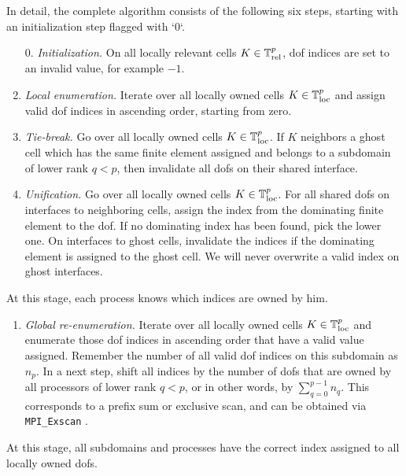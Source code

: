 In detail, the complete algorithm consists of the following six steps, starting with an initialization step flagged with `0`.
\begin{enumerate}
  \item[0.] \textit{Initialization.}
  On all locally relevant cells $K \in \mathbb{T}^p_{\text{rel}}$, \gls{dof} indices are set to an invalid value, for example $-1$.
  \item \textit{Local enumeration.}
  Iterate over all locally owned cells $K \in \mathbb{T}^p_{\text{loc}}$ and assign valid \gls{dof} indices in ascending order, starting from zero.
  \item \textit{Tie-break.}
  Go over all locally owned cells $K \in \mathbb{T}^p_{\text{loc}}$. If $K$ neighbors a ghost cell which has the same finite element assigned and belongs to a subdomain of lower rank $q < p$, then invalidate all \glspl{dof} on their shared interface.
  \item \textit{Unification.}
  Go over all locally owned cells $K \in \mathbb{T}^p_{\text{loc}}$. For all shared \glspl{dof} on interfaces to neighboring cells, assign the index from the dominating finite element to the \gls{dof}. If no dominating index has been found, pick the lower one. On interfaces to ghost cells, invalidate the indices if the dominating element is assigned to the ghost cell. We will never overwrite a valid index on ghost interfaces.
\end{enumerate}
At this stage, each process knows which indices are owned by him.
\begin{enumerate}[resume]
  \item \textit{Global re-enumeration.}
  Iterate over all locally owned cells $K \in \mathbb{T}^p_{\text{loc}}$
  and enumerate those \gls{dof} indices in ascending order that have a valid value assigned. Remember the number of all valid \gls{dof} indices on this subdomain as $n_p$. In a next step, shift all indices by the number of \glspl{dof} that are owned by all processors of lower rank $q < p$, or in other words, by $\sum_{q=0}^{p-1} n_q$. This corresponds to a prefix sum or exclusive scan, and can be obtained via \texttt{MPI\_Exscan} \textcite{mpi31}.
\end{enumerate}
At this stage, all subdomains and processes have the correct index assigned to all locally owned \glspl{dof}.
